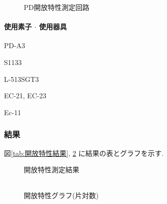 \documentclass[titlepage]{jsarticle}
\begin{document}
            \begin{figure}[ht]
                \centering
                \caption{PD開放特性測定回路}
                \label{fig:開放特性回路}
            \end{figure}
            
            \paragraph{使用素子 $\cdot$ 使用器具}
                \begin{description}
                    \setlength{\leftskip}{1.5em}
                    \item[組立済回路] PD-A3
                    \item[PD] S1133
                    \item[LED] L-513SGT3
                    \item[デジタルマルチメータ] EC-21, EC-23
                    \item[直流電源] Ec-11
                \end{description}

        \subsubsection{結果}
            図\ref{tab:開放特性結果}, \ref{fig:開放特性グラフ}
            に結果の表とグラフを示す.

            \begin{figure}[ht]
                \def\@captype{table}
                \begin{minipage}{0.5\hsize}
                    \begin{center}
                        \caption{開放特性測定結果}
                        \label{tab:開放特性結果}
                        \begin{tabular}{c|c}
                            
                        \end{tabular}
                    \end{center}
                \end{minipage}
                \begin{minipage}{0.5\hsize}
                    \begin{center}
                        \caption{開放特性グラフ(片対数)}
                        \label{fig:開放特性グラフ}
                    \end{center}
                \end{minipage}
            \end{figure}
\end{document}
